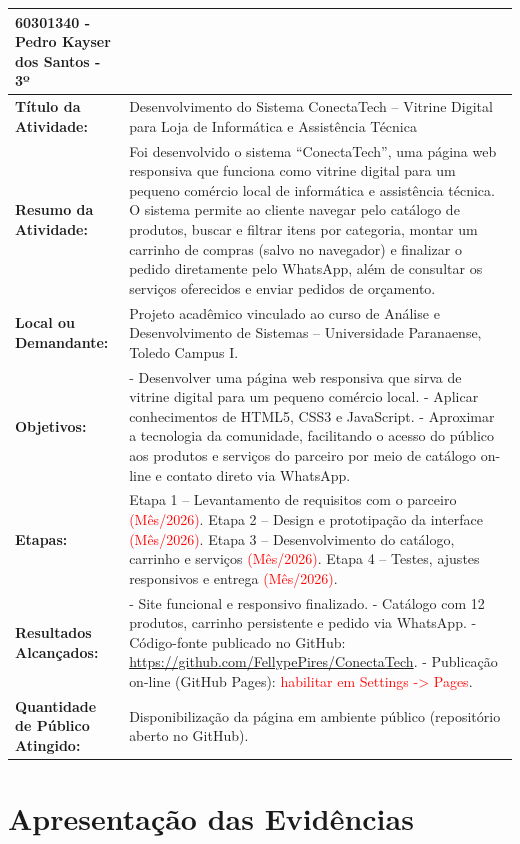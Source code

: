 \documentclass[12pt,a4paper]{article}
\begin{document}
\begin{tabularx}{\textwidth}{|p{5cm}|X|}
60301340 - Pedro Kayser dos Santos - 3º \\
\hline
\textbf{Título da Atividade:} & Desenvolvimento do Sistema ConectaTech – Vitrine Digital para Loja de Informática e Assistência Técnica \\
\hline
\textbf{Resumo da Atividade:} & Foi desenvolvido o sistema ``ConectaTech'', uma página web responsiva que funciona como vitrine digital para um pequeno comércio local de informática e assistência técnica. O sistema permite ao cliente navegar pelo catálogo de produtos, buscar e filtrar itens por categoria, montar um carrinho de compras (salvo no navegador) e finalizar o pedido diretamente pelo WhatsApp, além de consultar os serviços oferecidos e enviar pedidos de orçamento. \\
\hline
\textbf{Local ou Demandante:} & Projeto acadêmico vinculado ao curso de Análise e Desenvolvimento de Sistemas -- Universidade Paranaense, Toledo Campus I. \\
\hline
\textbf{Objetivos:} & - Desenvolver uma página web responsiva que sirva de vitrine digital para um pequeno comércio local.
- Aplicar conhecimentos de HTML5, CSS3 e JavaScript.
- Aproximar a tecnologia da comunidade, facilitando o acesso do público aos produtos e serviços do parceiro por meio de catálogo on-line e contato direto via WhatsApp. \\
\hline
\textbf{Etapas:} & Etapa 1 -- Levantamento de requisitos com o parceiro \textcolor{red}{(Mês/2026)}.
Etapa 2 -- Design e prototipação da interface \textcolor{red}{(Mês/2026)}.
Etapa 3 -- Desenvolvimento do catálogo, carrinho e serviços \textcolor{red}{(Mês/2026)}.
Etapa 4 -- Testes, ajustes responsivos e entrega \textcolor{red}{(Mês/2026)}. \\
\hline
\textbf{Resultados Alcançados:} & - Site funcional e responsivo finalizado.
- Catálogo com 12 produtos, carrinho persistente e pedido via WhatsApp.
- Código-fonte publicado no GitHub: \url{https://github.com/FellypePires/ConectaTech}.
- Publicação on-line (GitHub Pages): \textcolor{red}{habilitar em Settings -> Pages}. \\
\hline
\textbf{Quantidade de Público Atingido:} & Disponibilização da página em ambiente público (repositório aberto no GitHub). \\
\hline
\end{tabularx}

\newpage

\section*{Apresentação das Evidências}
\end{document}
